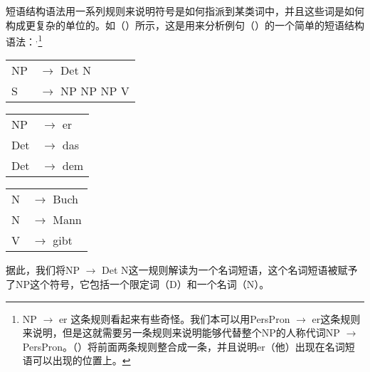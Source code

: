 短语结构语法用一系列规则来说明符号是如何指派到某类词中，并且这些词是如何构成更复杂的单位的。如（）所示，这是用来分析例句（）的一个简单的短语结构语法：$^,$\footnote{\label{fn-np-pron-ps-rule}%
NP $\to$ er 这条规则看起来有些奇怪。我们本可以用PersPron $\to$ er这条规则来说明，但是这就需要另一条规则来说明能够代替整个NP的人称代词NP $\to$ PersPron。（）将前面两条规则整合成一条，并且说明er（他）出现在名词短语可以出现的位置上。
}

\ea
\label{bsp-grammatik-psg}
\begin{tabular}[t]{@{}l@{ }l}
{NP} & {$\to$ Det N}\\          
{S}  & {$\to$ NP NP NP V}
\end{tabular}\hspace{2cm}%
\begin{tabular}[t]{@{}l@{ }l}
{NP} & {$\to$ er}\\
{Det}  & {$\to$ das}\\
{Det}  & {$\to$ dem}\\
\end{tabular}\hspace{8mm}
\begin{tabular}[t]{@{}l@{ }l}
{N} & {$\to$ Buch}\\
{N} & {$\to$ Mann}\\
{V} & {$\to$ gibt}\\
\end{tabular}
\z
据此，我们将NP $\to$\isce{$\to$}{$\to$} Det N这一规则解读为一个名词短语，这个名词短语被赋予了NP这个符号，它包括一个限定词（D）和一个名词（N）。

